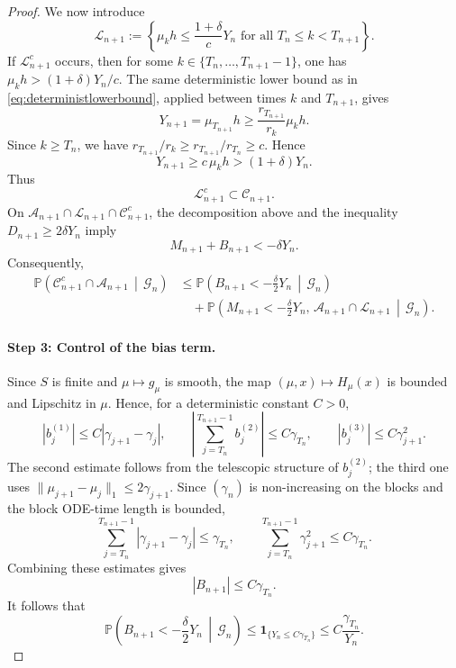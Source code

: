 \documentclass[10pt,letterpaper]{article}
\theoremstyle{compactplain}
\theoremstyle{compactdefinition}
\newcommand{\1}{\mathds{1}}
\begin{document}
\begin{proof}
We now introduce
\[
\mathcal L_{n+1}
:=
\left\{
\mu_kh\leq \frac{1+\delta}{c}Y_n
\text{ for all }T_n\leq k<T_{n+1}
\right\}.
\]
If \(\mathcal L_{n+1}^c\) occurs, then for some
\(k\in\{T_n,\ldots,T_{n+1}-1\}\), one has
\(\mu_kh>(1+\delta)Y_n/c\). The same deterministic lower bound as in \eqref{eq:deterministlowerbound}, applied between times \(k\) and \(T_{n+1}\), gives
\[
Y_{n+1}
=
\mu_{T_{n+1}}h
\geq
\frac{r_{T_{n+1}}}{r_k}\mu_kh.
\]
Since \(k\geq T_n\), we have
\(r_{T_{n+1}}/r_k\geq r_{T_{n+1}}/r_{T_n}\geq c\). Hence
\[
Y_{n+1}\geq c\,\mu_kh>(1+\delta)Y_n.
\]
Thus \[
\mathcal L_{n+1}^c\subset\mathcal C_{n+1}.
\]
On
\(\mathcal A_{n+1}\cap\mathcal L_{n+1}\cap\mathcal C_{n+1}^c\),
the decomposition above and the inequality \(D_{n+1}\geq2\delta Y_n\)
imply
\[
M_{n+1}+B_{n+1}<-\delta Y_n.
\]
Consequently,
\begin{equation}
\label{eq:probasplit}
\begin{aligned}
\mathbb P\left(
\mathcal C_{n+1}^c\cap\mathcal A_{n+1}
\,\middle|\,
\mathcal G_n
\right)
&\leq
\mathbb P\left(
B_{n+1}<-\frac{\delta}{2}Y_n
\,\middle|\,
\mathcal G_n
\right)\\
&\quad+
\mathbb P\left(
M_{n+1}<-\frac{\delta}{2}Y_n,\,
\mathcal A_{n+1}\cap\mathcal L_{n+1}
\,\middle|\,
\mathcal G_n
\right).
\end{aligned}
\end{equation}

\paragraph{Step 3: Control of the bias term.}
Since \(S\) is finite and \(\mu\mapsto g_\mu\) is smooth, the map
\((\mu,x)\mapsto H_\mu(x)\) is bounded and Lipschitz in \(\mu\). Hence, for a
deterministic constant \(C>0\),
\[
|b_j^{(1)}|
\leq
C|\gamma_{j+1}-\gamma_j|,
\qquad
\left|
\sum_{j=T_n}^{T_{n+1}-1}b_j^{(2)}
\right|
\leq
C\gamma_{T_n},
\qquad
|b_j^{(3)}|
\leq
C\gamma_{j+1}^2.
\]
The second estimate follows from the telescopic structure of \(b_j^{(2)}\);
the third one uses
\(\|\mu_{j+1}-\mu_j\|_1\leq 2\gamma_{j+1}\). Since \((\gamma_n)\) is
non-increasing on the blocks and the block ODE-time length is bounded,
\[
\sum_{j=T_n}^{T_{n+1}-1}|\gamma_{j+1}-\gamma_j|\leq\gamma_{T_n},
\qquad
\sum_{j=T_n}^{T_{n+1}-1}\gamma_{j+1}^2\leq C\gamma_{T_n}.
\]
Combining these estimates gives 
\[
|B_{n+1}|\leq C\gamma_{T_n}.
\]
It follows that
\[
\mathbb P\left(
B_{n+1}<-\frac{\delta}{2}Y_n
\,\middle|\,
\mathcal G_n
\right)
\leq
\mathbf 1_{\{Y_n\leq C\gamma_{T_n}\}}
\leq
C\frac{\gamma_{T_n}}{Y_n}.
\]


\end{proof}
\end{document}
